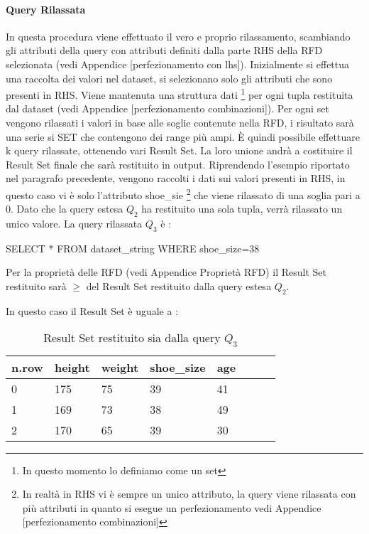 \paragraph{Query Rilassata}
In questa procedura viene effettuato il vero e proprio rilassamento, scambiando gli attributi della query con attributi definiti dalla parte RHS della RFD selezionata (vedi Appendice [perfezionamento con lhs]).
Inizialmente si effettua una raccolta dei valori nel dataset, si selezionano solo gli attributi che sono presenti in RHS. Viene mantenuta una struttura dati \footnote{In questo momento lo definiamo come un set} per ogni tupla restituita dal dataset (vedi Appendice [perfezionamento combinazioni]). 
Per ogni set vengono rilassati i valori in base alle soglie contenute nella RFD, i risultato sarà una serie si SET che contengono dei range più ampi.
È quindi possibile effettuare k query rilassate, ottenendo vari Result Set. La loro unione andrà a costituire il Result Set finale che sarà restituito in output.
Riprendendo l'esempio riportato nel paragrafo precedente, vengono raccolti i dati sui valori presenti in RHS, in questo caso vi è solo l'attributo shoe{\_}sie \footnote{In realtà in RHS vi è sempre un unico attributo, la query viene rilassata con più attributi in quanto si esegue un perfezionamento vedi  Appendice [perfezionamento combinazioni]} che viene rilassato di una soglia pari a 0. Dato che la query estesa $Q_2$ ha restituito una sola tupla, verrà rilassato un unico valore. La query rilassata $Q_3$  è : \newline 
\centerline{SELECT * FROM dataset{\_}string WHERE shoe{\_}size=38}
\newline
Per la proprietà delle RFD (vedi Appendice Proprietà RFD) il Result Set restituito sarà $\geq$ del Result Set restituito dalla query estesa $Q_2$.

In questo caso il Result Set è uguale a :
\begin{table}[H]
    \centering
    \begin{tabular}{l l l l l l l l}
    n.row  & height & weight & shoe{\_}size & age \\
    \hline
    0  & 175 & 75 & 39 & 41 \\
    1  & 169 & 73 & 38 & 49 \\
    2  & 170 & 65 & 39 & 30 \\
    \end{tabular}
    \caption{Result Set restituito sia dalla query $Q_3$ }
    \label{tab:relax_result_set}
\end{table}

